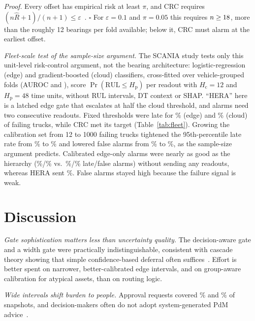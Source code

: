 \documentclass[conference]{IEEEtran}
\newcommand{\Hc}{H_{\mathrm{c}}}
\newcommand{\Hp}{H_{\mathrm{p}}}
\begin{document}
\textit{Proof.} Every offset has empirical risk at least $\pi$, and CRC requires $(n\hat R+1)/(n+1)\le\varepsilon$~\cite{angelopoulos2024crc}. $\square$ For $\varepsilon{=}0.1$ and $\pi{=}0.05$ this requires $n\ge18$, more than the roughly 12 bearings per fold available; below it, CRC must alarm at the earliest offset.



\textit{Fleet-scale test of the sample-size argument.}\label{sec:fleet} The SCANIA study tests only this unit-level risk-control argument, not the bearing architecture: logistic-regression (edge) and gradient-boosted (cloud) classifiers, cross-fitted over vehicle-grouped folds (AUROC \flAucEdge{} and \flAucCloud), score $\Pr(\mathrm{RUL}\le\Hp)$ per readout with $\Hc{=}12$ and $\Hp{=}48$ time units, without RUL intervals, DT context or SHAP. ``HERA'' here is a latched edge gate that escalates at half the cloud threshold, and alarms need two consecutive readouts. Fixed thresholds were late for \flFixEdLate\% (edge) and \flFixClLate\% (cloud) of failing trucks, while CRC met its target (Table~\ref{tab:fleet}). Growing the calibration set from 12 to 1000 failing trucks tightened the 95th-percentile late rate from \flClSmallLateQ\% to \flClBigLateQ\% and lowered false alarms from \flClSmallFa\% to \flClBigFa\%, as the sample-size argument predicts. Calibrated edge-only alarms were nearly as good as the hierarchy (\flEdBigLate\%/\flEdBigFa\% vs.\ \flHeBigLate\%/\flHeBigFa\% late/false alarms) without sending any readouts, whereas HERA sent \flHeBigEsc\%. False alarms stayed high because the failure signal is weak.

\section{Discussion}
\textit{Gate sophistication matters less than uncertainty quality.} The decision-aware gate and a width gate were practically indistinguishable, consistent with cascade theory showing that simple confidence-based deferral often suffices~\cite{jitkrittum2023cascade}. Effort is better spent on narrower, better-calibrated edge intervals, and on group-aware calibration for atypical assets, than on routing logic.

\textit{Wide intervals shift burden to people.} Approval requests covered \feApprHera\% and \xjApprHera\% of snapshots, and decision-makers often do not adopt system-generated PdM advice~\cite{vanoudenhoven2023pdm5}.
\end{document}
